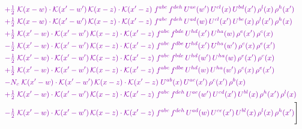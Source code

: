 \documentclass[10pt]{article}
\numberwithin{equation}{section}
\begin{document}
\begin{align}
&\quad{\color{CC}+\tfrac{1}{2}\;\mathcal{K}(x-w)\cdot\mathcal{K}(x'-w')\,\mathcal{K}(x-z)\cdot\mathcal{K}(x'-z)\;f^{abc}\,f^{deh}\,U^{ae}(w')\,U^{cl}(x)\,U^{bd}(x')\,\rho^{l}(x)\,\rho^{h}(x')}\notag\\
&\quad{\color{CC}+\tfrac{1}{2}\;\mathcal{K}(x-w)\cdot\mathcal{K}(x'-w')\,\mathcal{K}(x-z)\cdot\mathcal{K}(x'-z)\;f^{abc}\,f^{deh}\,U^{ad}(w)\,U^{cl}(x')\,U^{be}(x)\,\rho^{l}(x')\,\rho^{h}(x)}\notag\\
&\quad{\color{CC}+\tfrac{1}{2}\;\mathcal{K}(x'-w)\cdot\mathcal{K}(x'-w')\,\mathcal{K}(x-z)\cdot\mathcal{K}(x'-z)\;f^{abc}\,f^{bde}\,U^{hd}(x')\,U^{ha}(w)\,\rho^{e}(x')\,\rho^{c}(x)}\notag\\
&\quad{\color{CC}-\tfrac{1}{2}\;\mathcal{K}(x'-w)\cdot\mathcal{K}(x'-w')\,\mathcal{K}(x-z)\cdot\mathcal{K}(x'-z)\;f^{abc}\,f^{dbe}\,U^{hd}(x')\,U^{ha}(w')\,\rho^{c}(x)\,\rho^{e}(x')}\notag\\
&\quad{\color{CC}-\tfrac{1}{2}\;\mathcal{K}(x'-w)\cdot\mathcal{K}(x'-w')\,\mathcal{K}(x-z)\cdot\mathcal{K}(x'-z)\;f^{abc}\,f^{bde}\,U^{hd}(w')\,U^{ha}(w)\,\rho^{e}(x')\,\rho^{c}(x)}\notag\\
&\quad{\color{CC}+\tfrac{1}{2}\;\mathcal{K}(x'-w)\cdot\mathcal{K}(x'-w')\,\mathcal{K}(x-z)\cdot\mathcal{K}(x'-z)\;f^{abc}\,f^{dbe}\,U^{hd}(w)\,U^{ha}(w')\,\rho^{c}(x)\,\rho^{e}(x')}\notag\\
&\quad{\color{CC}-N_c\;\mathcal{K}(x'-w)\cdot\mathcal{K}(x'-w')\,\mathcal{K}(x-z)\cdot\mathcal{K}(x'-z)\;U^{ab}(x)\,U^{ac}(x')\,\rho^{c}(x')\,\rho^{b}(x)}\notag\\
&\quad{\color{CC}+\tfrac{1}{2}\;\mathcal{K}(x'-w)\cdot\mathcal{K}(x'-w')\,\mathcal{K}(x-z)\cdot\mathcal{K}(x'-z)\;f^{abc}\,f^{deh}\,U^{ae}(w')\,U^{cd}(x')\,U^{bl}(x)\,\rho^{h}(x')\,\rho^{l}(x)}\notag\\
&\quad{\color{CC}-\tfrac{1}{2}\;\mathcal{K}(x'-w)\cdot\mathcal{K}(x'-w')\,\mathcal{K}(x-z)\cdot\mathcal{K}(x'-z)\;f^{abc}\,f^{deh}\,U^{ad}(w)\,U^{ce}(x')\,U^{bl}(x)\,\rho^{l}(x)\,\rho^{h}(x')}\Bigg]\label{eq:P12}
\end{align}
\end{document}
